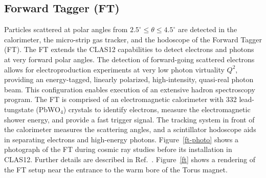 \documentclass[final,3p,twocolumn]{elsarticle}
\begin{document}
\subsection{Forward Tagger (FT)}

Particles scattered at polar angles from $2.5^\circ \le \theta \le 4.5^\circ $ are detected in the calorimeter, the
micro-strip gas tracker, and the hodoscope of the Forward Tagger (FT). The FT extends the CLAS12 capabilities to
detect electrons and photons at very forward polar angles. The detection of forward-going scattered electrons allows
for electroproduction experiments at very low photon virtuality $Q^2$, providing an energy-tagged, linearly polarized,
high-intensity, quasi-real photon beam. This configuration enables execution of an extensive hadron spectroscopy
program. The FT is comprised of an electromagnetic calorimeter with 332 lead-tungstate (PbWO$_4$) crystals to
identify electrons,  measure the electromagnetic shower energy, and provide a fast trigger signal. The tracking system
in front of the calorimeter  measures the scattering angles, and a scintillator hodoscope aids in separating electrons and
high-energy photons. Figure~\ref{ft-photo} shows a photograph of the FT during cosmic ray studies before its installation
in CLAS12. Further details are described in Ref.~\cite{FT}. Figure~\ref{ft} shows a rendering of the FT setup near the
entrance to the warm bore of the Torus magnet.   
\end{document}
